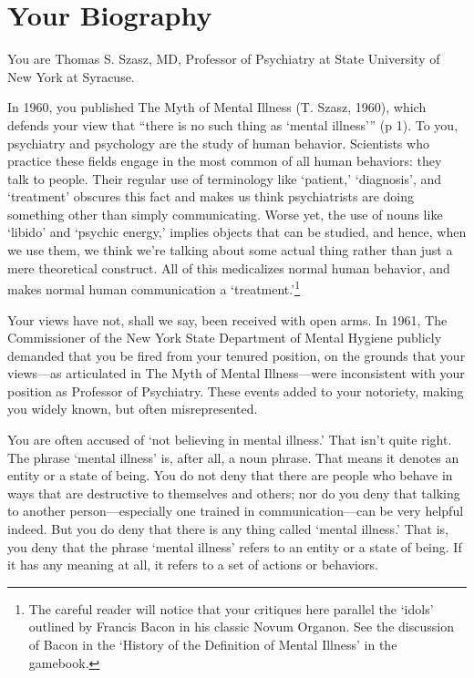 \section{Your Biography}
\label{yourbiography}

You are Thomas S. Szasz, MD, Professor of Psychiatry at State University of New York at Syracuse.

In 1960, you published The Myth of Mental Illness (T. Szasz, 1960), which defends your view that ``there is no such thing as `mental illness''' (p 1). To you, psychiatry and psychology are the study of human behavior. Scientists who practice these fields engage in the most common of all human behaviors: they talk to people. Their regular use of terminology like `patient,' `diagnosis', and `treatment' obscures this fact and makes us think psychiatrists are doing something other than simply communicating. Worse yet, the use of nouns like `libido' and `psychic energy,' implies objects that can be studied, and hence, when we use them, we think we're talking about some actual thing rather than just a mere theoretical construct. All of this medicalizes normal human behavior, and makes normal human communication a `treatment.'\footnote{The careful reader will notice that your critiques here parallel the `idols' outlined by Francis Bacon in his classic Novum Organon. See the discussion of Bacon in the `History of the Definition of Mental Illness' in the gamebook.} 

Your views have not, shall we say, been received with open arms. In 1961, The Commissioner of the New York State Department of Mental Hygiene publicly demanded that you be fired from your tenured position, on the grounds that your views---as articulated in The Myth of Mental Illness---were inconsistent with your position as Professor of Psychiatry. These events added to your notoriety, making you widely known, but often misrepresented.

You are often accused of `not believing in mental illness.' That isn't quite right. The phrase `mental illness' is, after all, a noun phrase. That means it denotes an entity or a state of being. You do not deny that there are people who behave in ways that are destructive to themselves and others; nor do you deny that talking to another person---especially one trained in communication---can be very helpful indeed. But you do deny that there is any thing called `mental illness.' That is, you deny that the phrase `mental illness' refers to an entity or a state of being. If it has any meaning at all, it refers to a set of actions or behaviors.

